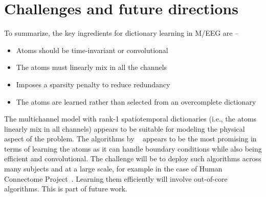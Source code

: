 \section{Challenges and future directions}

To summarize, the key ingredients for dictionary learning in M/EEG are --

\begin{itemize}
\setlength{\itemsep}{1pt}
\setlength{\parskip}{0pt}
\setlength{\parsep}{0pt}
\item Atoms should be time-invariant or convolutional
\item The atoms must linearly mix in all the channels
\item Imposes a sparsity penalty to reduce redundancy
\item The atoms are learned rather than selected from an overcomplete dictionary
\end{itemize}

The multichannel model with rank-1 spatiotemporal dictionaries (i.e., the atoms linearly mix in all channels) appears to be suitable for modeling the physical aspect of the problem. The algorithms by ~\citet{wohlberg2016efficient} appears to be the most promising in terms of learning the atoms as it can handle boundary conditions while also being efficient and convolutional. The challenge will be to deploy such algorithms across many subjects and at a large scale, for example in the case of Human Connectome Project~\citep{van2012human}. Learning them efficiently will involve out-of-core algorithms. This is part of future work.
